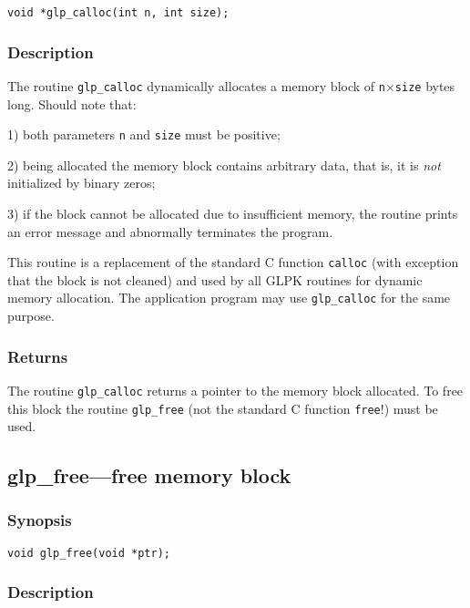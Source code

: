 \begin{verbatim}
void *glp_calloc(int n, int size);
\end{verbatim}

\subsubsection*{Description}

The routine \verb|glp_calloc| dynamically allocates a memory block of
\verb|n|$\times$\verb|size| bytes long. Should note that:

1) both parameters \verb|n| and \verb|size| must be positive;

2) being allocated the memory block contains arbitrary data, that is,
it is {\it not} initialized by binary zeros;

3) if the block cannot be allocated due to insufficient memory, the
routine prints an error message and abnormally terminates the program.

This routine is a replacement of the standard C function \verb|calloc|
(with exception that the block is not cleaned) and used by all GLPK
routines for dynamic memory allocation. The application program may use
\verb|glp_calloc| for the same purpose.

\subsubsection*{Returns}

The routine \verb|glp_calloc| returns a pointer to the memory block
allocated. To free this block the routine \verb|glp_free| (not the
standard C function \verb|free|!) must be used.

\subsection{glp\_free---free memory block}

\subsubsection*{Synopsis}

\begin{verbatim}
void glp_free(void *ptr);
\end{verbatim}

\subsubsection*{Description}

